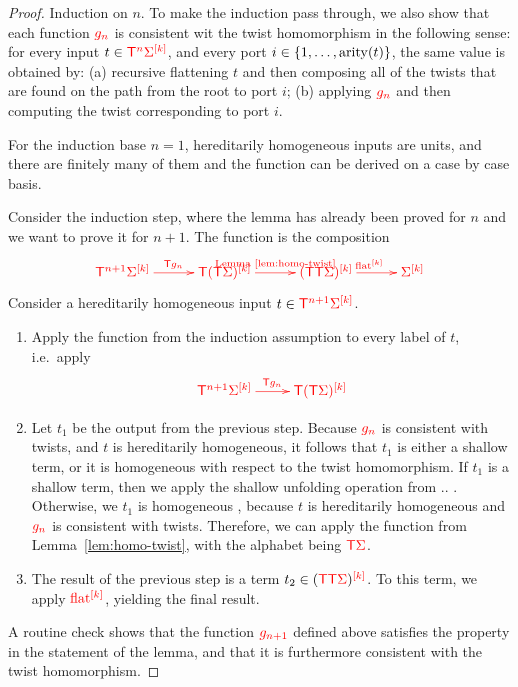 \begin{proof}
    Induction on $n$. To make the induction pass through, we also show that each function $\ranked{g_n}$ is consistent wit the  twist homomorphism in the following sense: for every input $t \in \tmonadn n \mati k \rSigma$, and every port $i \in \set{1,\ldots,\arity t}$, the same value is obtained by: (a) recursive flattening $t$ and then composing all of the twists that are found on the path from the root to port $i$; (b) applying $\ranked{g_n}$ and then computing the twist corresponding to port $i$. 
    
    For the induction base $n=1$, hereditarily homogeneous inputs are units, and there are finitely many of them and the function can be derived on a case by case basis. 
    
    Consider the induction step, where the lemma has already been proved for $n$ and we want to prove it for $n+1$. The function is the composition
    \begin{align*}
        \ranked{
            \xymatrix@C=1cm{
                \tmonadn {n+1} \mati k \Sigma \ar[r]^{\tmonad g_n} & \tmonad \mati k{(\tmonad \Sigma)} \ar[r]^{\text{Lemma~\ref{lem:homo-twist}}}&  \mati k  {(\tmonad \tmonad \rSigma)} \ar[r]^{\mati k \flatt} & \mati k \rSigma
            }
        }
    \end{align*}
    Consider a  hereditarily homogeneous input $t   \in \ranked{\tmonadn{n+1} \mati k \Sigma}$. 
    \begin{enumerate}
            \item Apply the function from the induction assumption to every label of $t$, i.e.~apply 
        \begin{align*}
        \ranked{
            \xymatrix{
                \tmonadn {n+1} \mati k \Sigma \ar[r]^{\tmonad g_n} & \tmonad \mati k{(\tmonad \Sigma)}
            }
        }
        \end{align*}
        \item Let $t_1$ be the output from the previous step. Because $\ranked {g_n}$ is consistent with twists, and $t$ is hereditarily homogeneous, it follows that $t_1$  is either a shallow term, or it is homogeneous with respect to the twist homomorphism.  If $t_1$ is a shallow term, then we apply the shallow unfolding operation from .. . Otherwise, we $t_1$ is homogeneous
        , because $t$ is hereditarily homogeneous and $\ranked{g_n}$ is consistent with twists. Therefore, we can apply the function
        from Lemma~\ref{lem:homo-twist}, with the alphabet being $\tmonad \rSigma$. 
        \item The result of the previous step is a term $t_2 \in \mati k {(\tmonad \tmonad \rSigma)}$. To this term, we apply $\mati k \flatt$, yielding the final result.
    \end{enumerate}
    A routine check shows that the function $\ranked{g_{n+1}}$ defined above satisfies the property in the statement of the lemma, and that it is furthermore consistent with the twist homomorphism.     
\end{proof}
